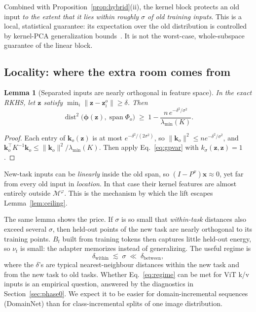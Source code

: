 \documentclass[11pt]{article}
\theoremstyle{plain}
\newtheorem{lemma}[proposition]{Lemma}
\theoremstyle{definition}
\theoremstyle{remark}
\newcommand{\M}{\mathcal{M}}
\newcommand{\spn}{\operatorname{span}}
\newcommand{\dist}{\operatorname{dist}}
\newcommand{\x}{\bm{x}}
\newcommand{\z}{\bm{z}}
\newcommand{\vphi}{\bm{\phi}}
\begin{document}
Combined with Proposition~\ref{prop:hybrid}(ii), the kernel block protects an old input \emph{to the extent that it lies within roughly $\sigma$ of old training inputs}. This is a local, statistical guarantee: its expectation over the old distribution is controlled by kernel-PCA generalization bounds~\cite{shawetaylor}. It is not the worst-case, whole-subspace guarantee of the linear block.

\subsection{Locality: where the extra room comes from}
\begin{lemma}[Separated inputs are nearly orthogonal in feature space]\label{lem:locality}
In the exact RKHS, let $\z$ satisfy $\min_i\|\z-\z^o_i\|\ge\delta$. Then
\begin{equation}\label{eq:locality}
\dist^2\big(\vphi(\z),\spn\Phi_o\big)\;\ge\;1-\frac{n\,e^{-\delta^2/\sigma^2}}{\lambda_{\min}(K)} .
\end{equation}
\end{lemma}
\begin{proof}
Each entry of $\bm k_o(\z)$ is at most $e^{-\delta^2/(2\sigma^2)}$, so $\|\bm k_o\|^2\le n e^{-\delta^2/\sigma^2}$, and $\bm k_o^{\top}K^{-1}\bm k_o\le\|\bm k_o\|^2/\lambda_{\min}(K)$. Then apply Eq.~\eqref{eq:gpvar} with $k_\sigma(\z,\z)=1$.
\end{proof}

New-task inputs can be \emph{linearly} inside the old span, so $(I-P^x)\x\approx 0$, yet far from every old input in \emph{location}. In that case their kernel features are almost entirely outside $\M^\varphi$. This is the mechanism by which the lift escapes Lemma~\ref{lem:ceiling}.

The same lemma shows the price. If $\sigma$ is so small that \emph{within-task} distances also exceed several $\sigma$, then held-out points of the new task are nearly orthogonal to its training points. $B_t$ built from training tokens then captures little held-out energy, so $\nu_t$ is small: the adapter memorizes instead of generalizing. The useful regime is
\begin{equation}\label{eq:regime}
\delta_{\text{within}}\;\lesssim\;\sigma\;\ll\;\delta_{\text{between}},
\end{equation}
where the $\delta$'s are typical nearest-neighbour distances within the new task and from the new task to old tasks. Whether Eq.~\eqref{eq:regime} can be met for ViT k/v inputs is an empirical question, answered by the diagnostics in Section~\ref{sec:phase0}. We expect it to be easier for domain-incremental sequences (DomainNet) than for class-incremental splits of one image distribution.
\end{document}
